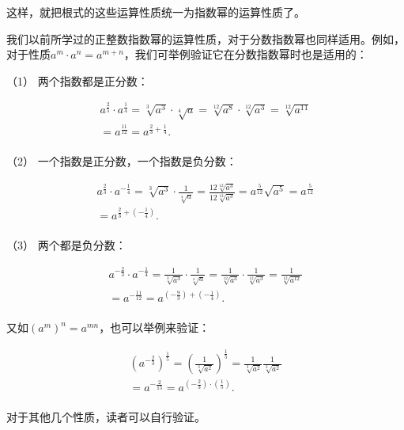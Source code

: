 这样，就把根式的这些运算性质统一为指数幂的运算性质了。

我们以前所学过的正整数指数幂的运算性质，对于分数指数幂也同样适用。例如，对于性质\(a^{m} \cdot a^{n} = a^{m + n}\)，我们可举例验证它在分数指数幂时也是适用的：

（1） 两个指数都是正分数：

\[
\begin{array}{l} a ^ {\frac{2}{5}} \cdot a ^ {\frac{1}{4}} = \sqrt[3]{a ^ {3}} \cdot \sqrt[4]{a} = \sqrt[12]{a ^ {8}} \cdot \sqrt[12]{a ^ {3}} = \sqrt[12]{a ^ {11}} \\ = a ^ {\frac{11}{12}} = a ^ {\frac{2}{3} + \frac{1}{4}}. \\ \end{array}
\]

（2） 一个指数是正分数，一个指数是负分数：

\[
\begin{array}{l} a ^ {\frac{2}{3}} \cdot a ^ {- \frac{1}{4}} = \sqrt[3]{a ^ {3}} \cdot \frac{1}{\sqrt[4]{a}} = \frac{12 \sqrt[12]{a ^ {3}}}{12 \sqrt[12]{a ^ {3}}} = a ^ {\frac{5}{12}} \sqrt {a ^ {5}} = a ^ {\frac{5}{12}} \\ = a ^ {\frac{2}{3} + \left(- \frac{1}{4}\right)}. \\ \end{array}
\]

（3） 两个都是负分数：

\[
\begin{array}{l} a ^ {- \frac{2}{3}} \cdot a ^ {- \frac{1}{4}} = \frac{1}{\sqrt[3]{a ^ {3}}} \cdot \frac{1}{\sqrt[4]{a}} = \frac{1}{\sqrt[12]{a ^ {3}}} \cdot \frac{1}{\sqrt[12]{a ^ {3}}} = \frac{1}{\sqrt[12]{a ^ {12}}} \\ = a ^ {- \frac{11}{12}} = a ^ {\left(- \frac{9}{3}\right) + \left(- \frac{1}{4}\right)}. \\ \end{array}
\]

又如\((a^{m})^{n} = a^{mn}\)，也可以举例来验证：

\[
\begin{array}{l} \left(a ^ {- \frac{2}{3}}\right) ^ {\frac{1}{5}} = \left(\frac{1}{\sqrt[3]{a ^ {2}}}\right) ^ {\frac{1}{5}} = \frac{1}{\sqrt[3]{a ^ {2}}} \frac{1}{\sqrt[3]{a ^ {2}}} \\ = a ^ {- \frac{2}{15}} = a ^ {\left(- \frac{2}{3}\right) \cdot \left(\frac{1}{5}\right)}. \\ \end{array}
\]

 对于其他几个性质，读者可以自行验证。

